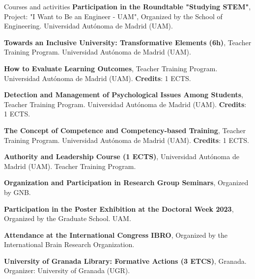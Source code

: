 \begin{rubric}{Courses and activities}
\entry*[June 2022] \textbf{Participation in the Roundtable "Studying STEM"}, Project: "I Want to Be an Engineer - UAM", Organized by the School of Engineering. Universidad Autónoma de Madrid (UAM).


 \entry*[May 9-11, 2022] \textbf{Towards an Inclusive University: Transformative Elements (6h)}, Teacher Training Program. Universidad Autónoma de Madrid (UAM).


 \entry*[February 15-17, 2023] \textbf{How to Evaluate Learning Outcomes}, Teacher Training Program. Universidad Autónoma de Madrid (UAM). \textbf{Credits}: 1 ECTS.

 \entry*[April 20-27, 2023] \textbf{Detection and Management of Psychological Issues Among Students}, Teacher Training Program. Universidad Autónoma de Madrid (UAM). \textbf{Credits}: 1 ECTS.

 \entry*[October 17-24, 2023] \textbf{The Concept of Competence and Competency-based Training}, Teacher Training Program. Universidad Autónoma de Madrid (UAM). \textbf{Credits}: 1 ECTS.

\entry*[February 19-20, 2024] \textbf{Authority and Leadership Course (1 ECTS)}, Universidad Autónoma de Madrid (UAM). Teacher Training Program.


  \textbf{Organization and Participation in Research Group Seminars}, Organized by GNB.

\entry*[June 2023] \textbf{Participation in the Poster Exhibition at the Doctoral Week 2023}, Organized by the Graduate School. UAM.

\entry*[September 2023] \textbf{Attendance at the International Congress IBRO}, Organized by the International Brain Research Organization.

 \textbf{University of Granada Library: Formative Actions (3 ETCS)}, Granada. Organizer: University of Granada (UGR).

\end{rubric}